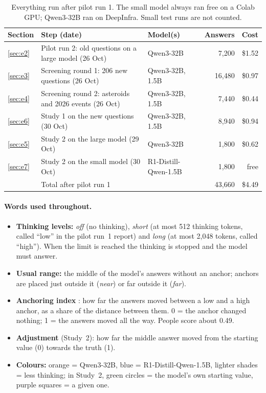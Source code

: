 \documentclass[11pt,a4paper]{article}
\begin{document}
\begin{table}[ht]
\centering\small
\begin{tabular}{@{}lp{5.2cm}p{3.3cm}rr@{}}
\toprule
Section & Step (date) & Model(s) & Answers & Cost \\
\midrule
\ref{sec:e2} & Pilot run 2: old questions on a large model (26 Oct) & Qwen3-32B & 7,200 & \$1.52 \\
\ref{sec:e3} & Screening round 1: 206 new questions (26 Oct) & Qwen3-32B, 1.5B & 16,480 & \$0.97 \\
\ref{sec:e4} & Screening round 2: asteroids and 2026 events (26 Oct) & Qwen3-32B, 1.5B & 7,440 & \$0.44 \\
\ref{sec:e6} & Study 1 on the new questions (30 Oct) & Qwen3-32B, 1.5B & 8,940 & \$0.94 \\
\ref{sec:e5} & Study 2 on the large model (29 Oct) & Qwen3-32B & 1,800 & \$0.62 \\
\ref{sec:e7} & Study 2 on the small model (30 Oct) & R1-Distill-Qwen-1.5B & 1,800 & free \\
\midrule
 & Total after pilot run 1 & & 43,660 & \$4.49 \\
\bottomrule
\end{tabular}
\caption{Everything run after pilot run 1. The small model always ran free on a Colab GPU; Qwen3-32B ran on DeepInfra. Small test runs are not counted.}
\label{tab:steps}
\end{table}

\paragraph{Words used throughout.}
\begin{itemize}[leftmargin=*]
  \item \textbf{Thinking levels:} \emph{off} (no thinking), \emph{short} (at most 512 thinking tokens, called \enquote{low} in the pilot run~1 report) and \emph{long} (at most 2,048 tokens, called \enquote{high}). When the limit is reached the thinking is stopped and the model must answer.
  \item \textbf{Usual range:} the middle of the model's answers without an anchor; anchors are placed just outside it (\emph{near}) or far outside it (\emph{far}).
  \item \textbf{Anchoring index} \citep{jacowitz1995measures}: how far the answers moved between a low and a high anchor, as a share of the distance between them. 0 = the anchor changed nothing; 1 = the answers moved all the way. People score about 0.49.
  \item \textbf{Adjustment} (Study~2): how far the middle answer moved from the starting value (0) towards the truth (1).
  \item \textbf{Colours:} orange = Qwen3-32B, blue = R1-Distill-Qwen-1.5B, lighter shades = less thinking; in Study~2, green circles = the model's own starting value, purple squares = a given one.
\end{itemize}
\end{document}
